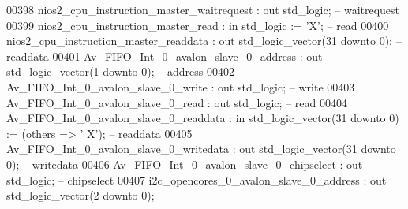 \begin{DoxyCode}
00398             nios2\_cpu\_instruction\_master\_waitrequest    : \textcolor{keywordflow}{out} \textcolor{comment}{std\_logic};                                   
           \textcolor{keyword}{-- waitrequest}
00399             nios2\_cpu\_instruction\_master\_read           : \textcolor{keywordflow}{in}  \textcolor{comment}{std\_logic}                     := 'X';        
           \textcolor{keyword}{-- read}
00400             nios2\_cpu\_instruction\_master\_readdata       : \textcolor{keywordflow}{out} \textcolor{comment}{std\_logic\_vector}(\textcolor{vhdllogic}{}\textcolor{vhdllogic}{31} \textcolor{keywordflow}{downto} \textcolor{vhdllogic}{}\textcolor{vhdllogic}{0});               
           \textcolor{keyword}{-- readdata}
00401             Av\_FIFO\_Int\_0\_avalon\_slave\_0\_address        : \textcolor{keywordflow}{out} \textcolor{comment}{std\_logic\_vector}(\textcolor{vhdllogic}{}\textcolor{vhdllogic}{1} \textcolor{keywordflow}{downto} \textcolor{vhdllogic}{}\textcolor{vhdllogic}{0});                
           \textcolor{keyword}{-- address}
00402             Av\_FIFO\_Int\_0\_avalon\_slave\_0\_write          : \textcolor{keywordflow}{out} \textcolor{comment}{std\_logic};                                   
           \textcolor{keyword}{-- write}
00403             Av\_FIFO\_Int\_0\_avalon\_slave\_0\_read           : \textcolor{keywordflow}{out} \textcolor{comment}{std\_logic};                                   
           \textcolor{keyword}{-- read}
00404             Av\_FIFO\_Int\_0\_avalon\_slave\_0\_readdata       : \textcolor{keywordflow}{in}  \textcolor{comment}{std\_logic\_vector}(\textcolor{vhdllogic}{}\textcolor{vhdllogic}{31} \textcolor{keywordflow}{downto} \textcolor{vhdllogic}{}\textcolor{vhdllogic}{0}) := (\textcolor{keywordflow}{others} => '
      X'); \textcolor{keyword}{-- readdata}
00405             Av\_FIFO\_Int\_0\_avalon\_slave\_0\_writedata      : \textcolor{keywordflow}{out} \textcolor{comment}{std\_logic\_vector}(\textcolor{vhdllogic}{}\textcolor{vhdllogic}{31} \textcolor{keywordflow}{downto} \textcolor{vhdllogic}{}\textcolor{vhdllogic}{0});               
           \textcolor{keyword}{-- writedata}
00406             Av\_FIFO\_Int\_0\_avalon\_slave\_0\_chipselect     : \textcolor{keywordflow}{out} \textcolor{comment}{std\_logic};                                   
           \textcolor{keyword}{-- chipselect}
00407             i2c\_opencores\_0\_avalon\_slave\_0\_address      : \textcolor{keywordflow}{out} \textcolor{comment}{std\_logic\_vector}(\textcolor{vhdllogic}{}\textcolor{vhdllogic}{2} \textcolor{keywordflow}{downto} \textcolor{vhdllogic}{}\textcolor{vhdllogic}{0});                

\end{DoxyCode}
